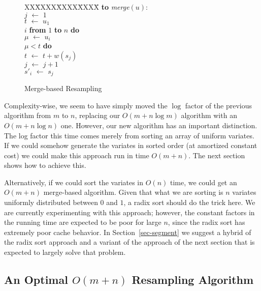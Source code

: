 \documentclass[12pt]{article}
\newcommand{\asgn}{\,\,\leftarrow\,\,}
\begin{document}
  \begin{figure}
    \centering
    \begin{minipage}{0.6\textwidth}
      \begin{tabbing}
      XX\=XXXX\=XXXX\=XXXX\=\kill
      {\bf to} {\it merge}$(u)$: \\
      \>$j \asgn 1$ \\
      \>$t \asgn u_1$ \\
       $i$ {\bf from} $1$ {\bf to} $n$ {\bf do} \\
      \>\>$\mu \asgn u_i$ \\
      \> $\mu < t$ {\bf do} \\
      \>\>\>$t \asgn t + w(s_j)$ \\
      \>\>\>$j \asgn j + 1$ \\
      \>\>$s'_i \asgn s_j$
    \end{tabbing}
    \end{minipage}
    \caption{Merge-based Resampling}\label{fig-merge}
  \end{figure}

  Complexity-wise, we seem to have simply moved the $\log$
  factor of the previous algorithm from $m$ to $n$,
  replacing our $O(m + n \log m)$ algorithm with an $O(m + n
  \log n)$ one.  However, our new algorithm has an important
  distinction.  The log factor this time comes merely from
  sorting an array of uniform variates.  If we could somehow
  generate the variates in sorted order (at amortized
  constant cost) we could make this approach run in time
  $O(m + n)$.  The next section shows how to achieve this.

  Alternatively, if we could sort the variates in $O(n)$
  time, we could get an $O(m + n)$ merge-based algorithm.
  Given that what we are sorting is $n$ variates uniformly
  distributed between $0$ and $1$, a radix sort should do
  the trick here.  We are currently experimenting with this
  approach; however, the constant factors in the running
  time are expected to be poor for large $n$, since the
  radix sort has extremely poor cache behavior.  In
  Section~\ref{sec-segment} we suggest a hybrid of the radix
  sort approach and a variant of the approach of the
  next section that is expected to largely
  solve that problem.

\subsection{An Optimal $O(m + n)$ Resampling Algorithm}\label{sec-optimal}
\end{document}

